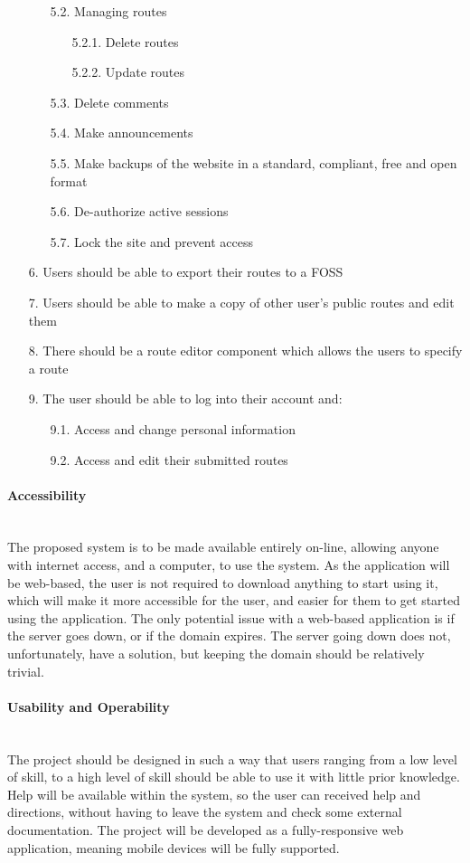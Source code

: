 \begin{enumerate}
\begin{enumerate}
 		\item[5.2.] Managing routes
 		\begin{enumerate}
 			\item[5.2.1.] Delete routes
 			\item[5.2.2.] Update routes
 		\end{enumerate}
 		\item[5.3.] Delete comments
 		\item[5.4.] Make announcements
 		\item[5.5.] Make backups of the website in a standard, compliant, free and open format
 		\item[5.6.] De-authorize active sessions
 		\item[5.7.] Lock the site and prevent access
 	\end{enumerate}
 \item[6.] Users should be able to export their routes to a FOSS
 \item[7.] Users should be able to make a copy of other user's public routes and edit them
 \item[8.] There should be a route editor component which allows the users to specify a route
 \item[9.] The user should be able to log into their account and:
	 \begin{enumerate}
	 	\item[9.1.] Access and change personal information
	  	\item[9.2.] Access and edit their submitted routes
	 \end{enumerate}
 \end{enumerate}

\paragraph{Accessibility}\ \\
The proposed system is to be made available entirely on-line, allowing anyone with internet access, and a computer, to use the system. As the application will be web-based, the user is not required to download anything to start using it, which will make it more accessible for the user, and easier for them to get started using the application. The only potential issue with a web-based application is if the server goes down, or if the domain expires. The server going down does not, unfortunately, have a solution, but keeping the domain should be relatively trivial.

\paragraph{Usability and Operability}\ \\
The project should be designed in such a way that users ranging from a low level of skill, to a high level of skill should be able to use it with little prior knowledge. Help will be available within the system, so the user can received help and directions, without having to leave the system and check some external documentation. The project will be developed as a fully-responsive web application, meaning mobile devices will be fully supported.

